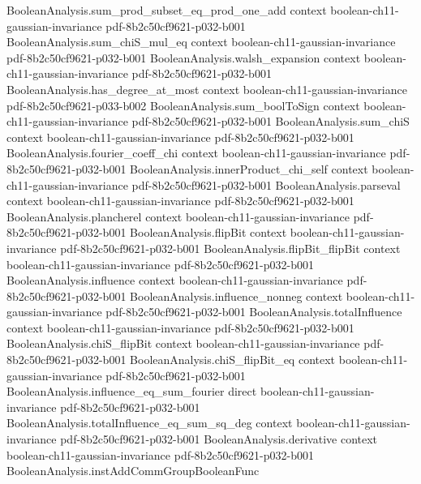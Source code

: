 \begin{theorem}
\proofstep
  {BooleanAnalysis.sum_prod_subset_eq_prod_one_add}
  {context}
  {boolean-ch11-gaussian-invariance}
  {pdf-8b2c50cf9621-p032-b001}
\proofstep
  {BooleanAnalysis.sum_chiS_mul_eq}
  {context}
  {boolean-ch11-gaussian-invariance}
  {pdf-8b2c50cf9621-p032-b001}
\proofstep
  {BooleanAnalysis.walsh_expansion}
  {context}
  {boolean-ch11-gaussian-invariance}
  {pdf-8b2c50cf9621-p032-b001}
\proofstep
  {BooleanAnalysis.has_degree_at_most}
  {context}
  {boolean-ch11-gaussian-invariance}
  {pdf-8b2c50cf9621-p033-b002}
\proofstep
  {BooleanAnalysis.sum_boolToSign}
  {context}
  {boolean-ch11-gaussian-invariance}
  {pdf-8b2c50cf9621-p032-b001}
\proofstep
  {BooleanAnalysis.sum_chiS}
  {context}
  {boolean-ch11-gaussian-invariance}
  {pdf-8b2c50cf9621-p032-b001}
\proofstep
  {BooleanAnalysis.fourier_coeff_chi}
  {context}
  {boolean-ch11-gaussian-invariance}
  {pdf-8b2c50cf9621-p032-b001}
\proofstep
  {BooleanAnalysis.innerProduct_chi_self}
  {context}
  {boolean-ch11-gaussian-invariance}
  {pdf-8b2c50cf9621-p032-b001}
\proofstep
  {BooleanAnalysis.parseval}
  {context}
  {boolean-ch11-gaussian-invariance}
  {pdf-8b2c50cf9621-p032-b001}
\proofstep
  {BooleanAnalysis.plancherel}
  {context}
  {boolean-ch11-gaussian-invariance}
  {pdf-8b2c50cf9621-p032-b001}
\proofstep
  {BooleanAnalysis.flipBit}
  {context}
  {boolean-ch11-gaussian-invariance}
  {pdf-8b2c50cf9621-p032-b001}
\proofstep
  {BooleanAnalysis.flipBit_flipBit}
  {context}
  {boolean-ch11-gaussian-invariance}
  {pdf-8b2c50cf9621-p032-b001}
\proofstep
  {BooleanAnalysis.influence}
  {context}
  {boolean-ch11-gaussian-invariance}
  {pdf-8b2c50cf9621-p032-b001}
\proofstep
  {BooleanAnalysis.influence_nonneg}
  {context}
  {boolean-ch11-gaussian-invariance}
  {pdf-8b2c50cf9621-p032-b001}
\proofstep
  {BooleanAnalysis.totalInfluence}
  {context}
  {boolean-ch11-gaussian-invariance}
  {pdf-8b2c50cf9621-p032-b001}
\proofstep
  {BooleanAnalysis.chiS_flipBit}
  {context}
  {boolean-ch11-gaussian-invariance}
  {pdf-8b2c50cf9621-p032-b001}
\proofstep
  {BooleanAnalysis.chiS_flipBit_eq}
  {context}
  {boolean-ch11-gaussian-invariance}
  {pdf-8b2c50cf9621-p032-b001}
\proofstep
  {BooleanAnalysis.influence_eq_sum_fourier}
  {direct}
  {boolean-ch11-gaussian-invariance}
  {pdf-8b2c50cf9621-p032-b001}
\proofstep
  {BooleanAnalysis.totalInfluence_eq_sum_sq_deg}
  {context}
  {boolean-ch11-gaussian-invariance}
  {pdf-8b2c50cf9621-p032-b001}
\proofstep
  {BooleanAnalysis.derivative}
  {context}
  {boolean-ch11-gaussian-invariance}
  {pdf-8b2c50cf9621-p032-b001}
\proofstep
  {BooleanAnalysis.instAddCommGroupBooleanFunc}

\end{theorem}
